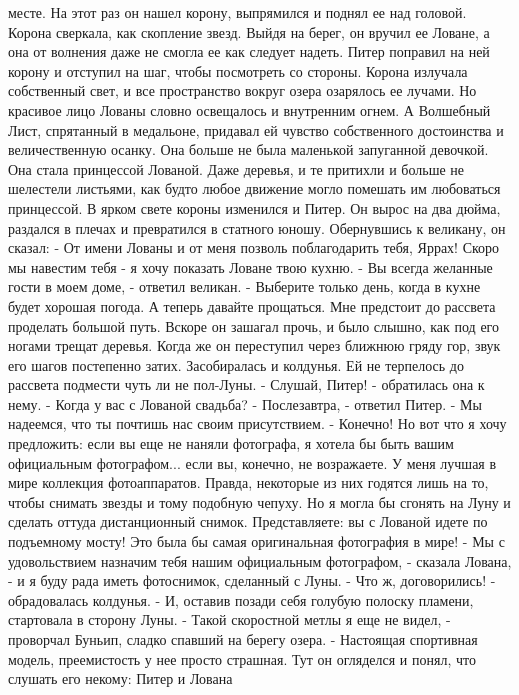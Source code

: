месте. На этот раз он нашел корону, выпрямился и поднял ее над 
головой. Корона сверкала, как скопление звезд. Выйдя на берег, он 
вручил ее Ловане, а она от волнения даже не смогла ее как следует 
надеть. Питер поправил на ней корону и отступил на шаг, чтобы 
посмотреть со стороны.
    Корона излучала собственный свет, и все пространство вокруг озера 
озарялось ее лучами. Но красивое лицо Лованы словно освещалось и 
внутренним огнем. А Волшебный Лист, спрятанный в медальоне, придавал 
ей чувство собственного достоинства и величественную осанку. Она 
больше не была маленькой запуганной девочкой. Она стала принцессой 
Лованой.
    Даже деревья, и те притихли и больше не шелестели листьями, как 
будто любое движение могло помешать им любоваться принцессой.
    В ярком свете короны изменился и Питер. Он вырос на два дюйма, 
раздался в плечах и превратился в статного юношу. Обернувшись к 
великану, он сказал:
    - От имени Лованы и от меня позволь поблагодарить тебя, Яррах! 
Скоро мы навестим тебя - я хочу показать Ловане твою кухню.
    - Вы всегда желанные гости в моем доме, - ответил великан. - 
Выберите только день, когда в кухне будет хорошая погода. А теперь 
давайте прощаться. Мне предстоит до рассвета проделать большой путь.
    Вскоре он зашагал прочь, и было слышно, как под его ногами трещат 
деревья. Когда же он переступил через ближнюю гряду гор, звук его 
шагов постепенно затих.
    Засобиралась и колдунья. Ей не терпелось до рассвета подмести чуть 
ли не пол-Луны.
    - Слушай, Питер! - обратилась она к нему. - Когда у вас с Лованой 
свадьба?
    - Послезавтра, - ответил Питер. - Мы надеемся, что ты почтишь нас 
своим присутствием.
    - Конечно! Но вот что я хочу предложить: если вы еще не наняли 
фотографа, я хотела бы быть вашим официальным фотографом... если вы, 
конечно, не возражаете. У меня лучшая в мире коллекция фотоаппаратов. 
Правда, некоторые из них годятся лишь на то, чтобы снимать звезды и 
тому подобную чепуху. Но я могла бы сгонять на Луну и сделать оттуда 
дистанционный снимок. Представляете: вы с Лованой идете по подъемному 
мосту! Это была бы самая оригинальная фотография в мире!
    - Мы с удовольствием назначим тебя нашим официальным фотографом, - 
сказала Лована, - и я буду рада иметь фотоснимок, сделанный с Луны.
    - Что ж, договорились! - обрадовалась колдунья. - И, оставив 
позади себя голубую полоску пламени, стартовала в сторону Луны.
    - Такой скоростной метлы я еще не видел, - проворчал Буньип, 
сладко спавший на берегу озера. - Настоящая спортивная модель, 
преемистость у нее просто страшная.
    Тут он огляделся и понял, что слушать его некому: Питер и Лована 
